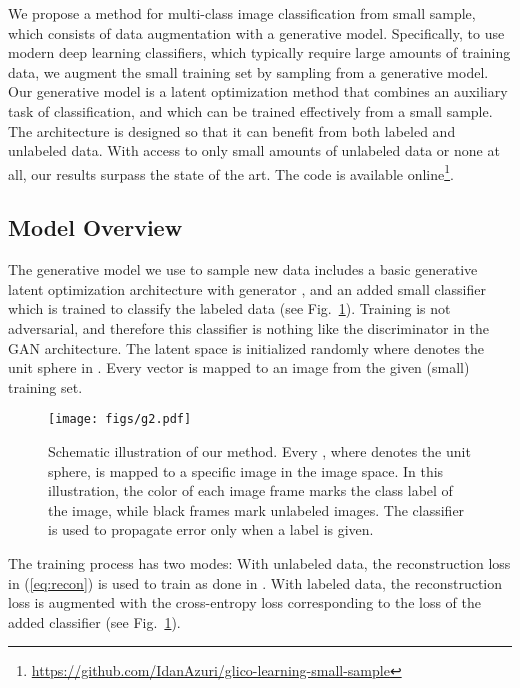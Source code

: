 \documentclass[a4paper,conference]{IEEEtran}
\begin{document}
We propose a method for multi-class image classification from small sample, which consists of data augmentation with a generative model. Specifically, to use modern deep learning classifiers, which typically require large amounts of training data, we augment the small training set by sampling from a generative model. Our generative model is a latent optimization method that combines an auxiliary task of classification, and which can be trained effectively from a small sample. The architecture is designed so that it can benefit from both labeled and unlabeled data. With access to only small amounts of unlabeled data or none at all, our results surpass the state of the art. 
The code is available online\footnote{\url{https://github.com/IdanAzuri/glico-learning-small-sample}}.


\subsection{Model Overview}

The generative model we use to sample new data includes a basic generative latent optimization architecture with generator , and an added small classifier  which is trained to classify the labeled data (see Fig.~\ref{fig:our_method}). Training is not adversarial, and therefore this classifier is nothing like the discriminator in the GAN architecture. The latent space is initialized randomly  where  denotes the unit sphere in . Every vector  is mapped to an image  from the given (small) training set.
		
\begin{figure}[t]
\begin{center}
		\centerline{\texttt{[image: figs/g2.pdf]}}
		\caption{Schematic illustration of our method. Every , where  denotes the unit sphere, is mapped to a specific image  in the image space. In this illustration, the color of each image frame marks the class label of the image, while black frames mark unlabeled images. The classifier is used to propagate error only when a label is given.}
		\label{fig:our_method}
	\end{center}
	\vskip -0.1in
\end{figure}

The training process has two modes: With unlabeled data, the reconstruction loss in (\ref{eq:recon}) is used to train  as done in \cite{pmlr-v80-bojanowski18a}. With labeled data, the reconstruction loss is augmented with the cross-entropy loss corresponding to the loss of the added classifier  (see Fig.~\ref{fig:our_method}). 
\end{document}

